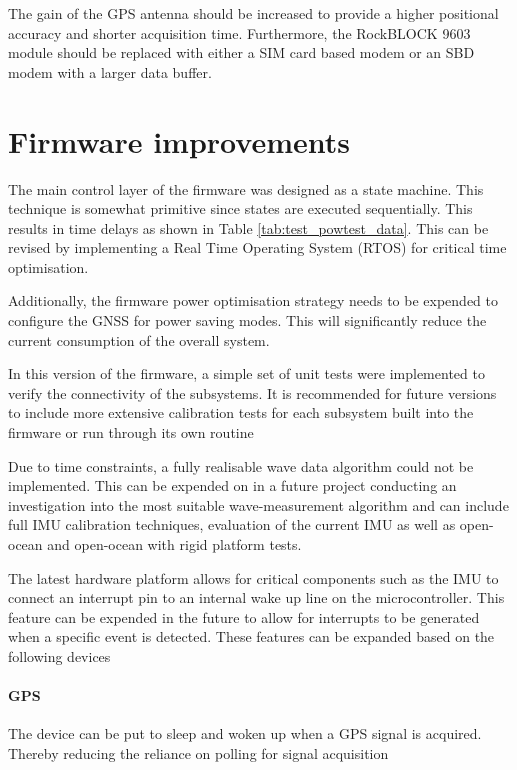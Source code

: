 The gain of the GPS antenna should be increased to provide a higher positional accuracy and shorter acquisition time. Furthermore, the RockBLOCK 9603 module should be replaced with either a SIM card based modem or an SBD modem with a larger data buffer.
\section{Firmware improvements}

The main control layer of the firmware was designed as a state machine. This technique is somewhat primitive since states are executed sequentially. This results in time delays as shown in Table \ref{tab:test_powtest_data}. This can be revised by implementing a Real Time Operating System (RTOS) for critical time optimisation. \par 

Additionally, the firmware power optimisation strategy needs to be expended to configure the GNSS for power saving modes. This will significantly reduce the current consumption of the overall system.\par 

In this version of the firmware, a simple set of unit tests were implemented to verify the connectivity of the subsystems. It is recommended for future versions to include more extensive calibration tests for each subsystem built into the firmware or run through its own routine \par 

Due to time constraints, a fully realisable wave data algorithm could not be implemented. This can be expended on in a future project conducting an investigation into the most suitable wave-measurement algorithm and can include full IMU calibration techniques, evaluation of the current IMU as well as open-ocean and open-ocean with rigid platform tests. \par 

The latest hardware platform allows for critical components such as the IMU to connect an interrupt pin to an internal wake up line on the microcontroller. This feature can be expended in the future to allow for interrupts to be generated when a specific event is detected. These features can be expanded based on the following devices

\paragraph{GPS}

The device can be put to sleep and woken up when a GPS signal is acquired. Thereby reducing the reliance on polling for signal acquisition

